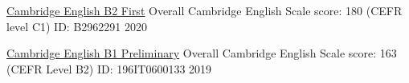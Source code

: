 

\begin{cvhonors}

  \cvhonor
    {\underline{\href{https://www.cambridgeenglish.org/exams-and-tests/first/}{Cambridge English B2 First}}} %
    {Overall Cambridge English Scale score: 180 (CEFR level C1)} %
    {ID: B2962291} %
    {2020} %

  \cvhonor
    {\underline{\href{https://www.cambridgeenglish.org/exams-and-tests/preliminary/}{Cambridge English B1 Preliminary}}} %
    {Overall Cambridge English Scale score: 163 (CEFR Level B2)} %
    {ID: 196IT0600133} %
    {2019} %

\end{cvhonors}

